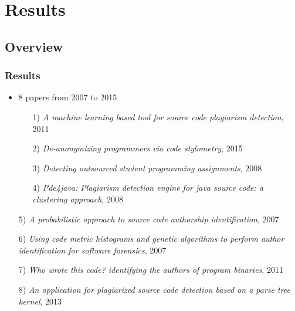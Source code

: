 \documentclass[t,12pt,pdftex]{beamer}
\begin{document}
\section{Results}
\subsection{Overview}
\begin{frame}
	\frametitle{Results}
	\begin{itemize}
		\item 8 papers from 2007 to 2015
		\begin{itemize}
			\item[1)] \textit{A machine learning based tool
for source code plagiarism detection}, 2011
			\item[2)] \textit{De-anonymizing
programmers via code stylometry}, 2015
			\item[3)] \textit{Detecting outsourced student
programming assignments}, 2008
			\item[4)] \textit{Pde4java: Plagiarism detection
engine for java source code: a clustering approach}, 2008
		\end{itemize}
	\end{itemize}
\end{frame}

\begin{frame}
	\vspace{0.5in}
	\begin{itemize}
	\item[5)] \textit{A probabilistic approach to source code authorship identification}, 2007
			\item[6)] \textit{Using code metric histograms and genetic algorithms to perform author identification for software forensics}, 2007
			\item[7)] \textit{Who wrote
this code? identifying the authors of program binaries}, 2011
			\item[8)] \textit{An application for plagiarized source code detection based on a parse
tree kernel}, 2013
	\end{itemize}
\end{frame}
\end{document}
